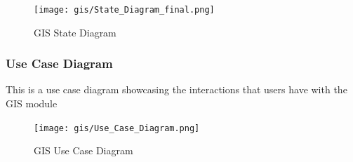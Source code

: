 \begin{figure}[H]

		\centering

		\texttt{[image: gis/State\_Diagram\_final.png]}

		\caption{GIS State Diagram}

\end{figure}





\pagebreak



\subsubsection{Use Case Diagram}

This is a use case diagram showcasing the interactions that users have with the GIS module

\begin{figure}[H]

		\centering

		\texttt{[image: gis/Use\_Case\_Diagram.png]}

		\caption{GIS Use Case Diagram }

\end{figure}




